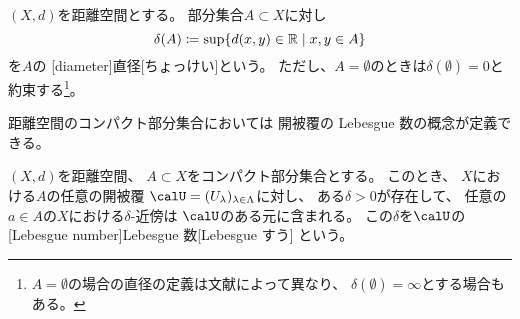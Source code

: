 \documentclass[report]{jlreq}
\begin{document}
\begin{definition}[集合の直径]
    $(X, d)$を距離空間とする。
    部分集合$A \subset X$に対し
    \begin{equation}
        \delta(A)
            \coloneqq \sup \{
                d(x, y) \in \mathbb{R}
                \mid
                x, y \in A
            \}
    \end{equation}
    を$A$の
    [diameter]{直径}[ちょっけい]という。
    ただし、$A = \emptyset$のときは$\delta(\emptyset) = 0$と約束する\footnote{
        $A = \emptyset$の場合の直径の定義は文献によって異なり、
        $\delta(\emptyset) = \infty$とする場合もある。
    }。
\end{definition}

距離空間のコンパクト部分集合においては
開被覆の Lebesgue 数の概念が定義できる。

\begin{theorem}
    $(X, d)$を距離空間、
    $A \subset X$をコンパクト部分集合とする。
    このとき、
    $X$における$A$の任意の開被覆
    $\calU = ( U_\lambda )_{\lambda \in \Lambda}$に対し、
    ある$\delta > 0$が存在して、
    任意の$a \in A$の$X$における$\delta$-近傍は
    $\calU$のある元に含まれる。
    この$\delta$を$\calU$の
    [Lebesgue number]{Lebesgue 数}[Lebesgue すう]
    という。
\end{theorem}
\end{document}
